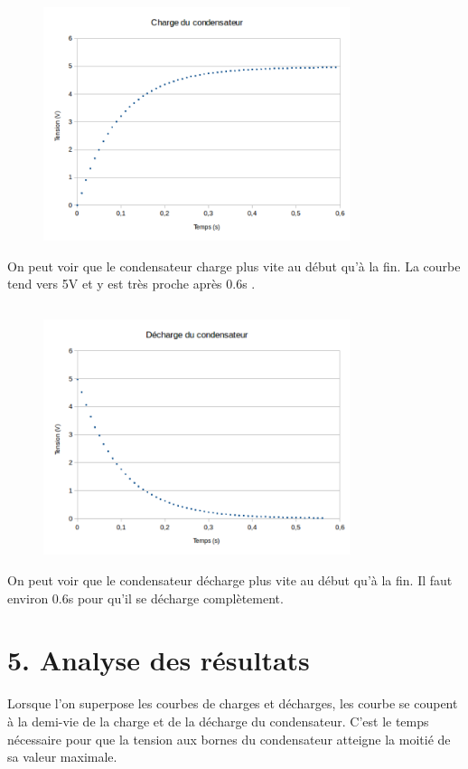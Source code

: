 \documentclass{report}
\begin{document}
\subsection*{}
\hspace*{0.5cm}
\begin{figure}[ht!]
\centering
\includegraphics[width=90mm]{charge.png}
\label{overflow}
\end{figure}
On peut voir que le condensateur charge plus vite au début qu'à la fin.
La courbe tend vers 5V et y est très proche après 0.6s .
\pagebreak
\subsection*{}
\begin{figure}[ht!]
\centering
\includegraphics[width=90mm]{decharge.png}
\label{overflow}
\end{figure}
On peut voir que le condensateur décharge plus vite au début qu'à la fin.
Il faut environ 0.6s pour qu'il se décharge complètement.
\hspace*{0.5cm}
\section*{5. Analyse des r\'esultats}
Lorsque l'on superpose les courbes de charges et décharges, les courbe se coupent à la demi-vie  de la charge et de la décharge du condensateur. C’est le temps nécessaire pour que la tension aux bornes du condensateur atteigne la moitié de sa valeur maximale.
\end{document}
